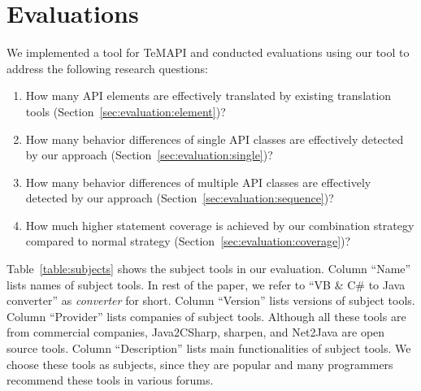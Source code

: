 
\section{Evaluations}
\label{sec:evaluation}

We implemented a tool for TeMAPI and conducted evaluations using our tool to address the following research questions:

\vspace*{-1.5ex}
\begin{enumerate}
\item How many API elements are effectively translated by existing translation tools (Section~\ref{sec:evaluation:element})? \vspace*{-1.8ex}
\item How many behavior differences of single API classes are effectively detected by our approach (Section~\ref{sec:evaluation:single})?\vspace*{-1.8ex}
\item How many behavior differences of multiple API classes are effectively detected by our approach (Section~\ref{sec:evaluation:sequence})?\vspace*{-1.8ex}
\item How much higher statement coverage is achieved by our combination strategy compared to normal strategy (Section~\ref{sec:evaluation:coverage})?
\end{enumerate}\vspace*{-1.5ex}

Table~\ref{table:subjects} shows the subject tools in our evaluation. Column ``Name'' lists names of subject tools. In rest of the paper, we refer to ``VB \& C\# to Java converter'' as \emph{converter} for short. Column ``Version'' lists versions of subject tools. Column ``Provider'' lists companies of subject tools. Although all these tools are from commercial companies, Java2CSharp, sharpen, and Net2Java are open source tools. Column ``Description'' lists main functionalities of subject tools. We choose these tools as subjects, since they are popular and many programmers recommend these tools in various forums.

